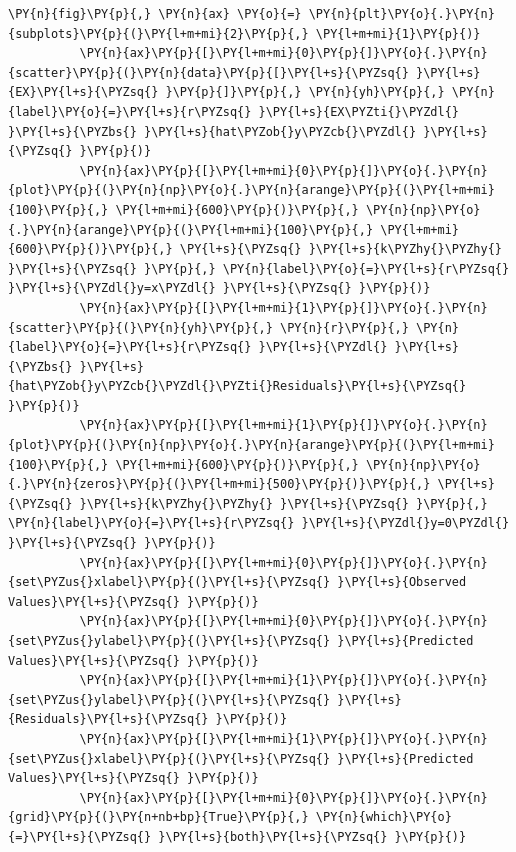 \documentclass[10pt]{article}\usepackage[]{graphicx}\usepackage[]{xcolor}
\begin{document}
    \begin{Verbatim}[commandchars=\\\{\}]
 \PY{n}{fig}\PY{p}{,} \PY{n}{ax} \PY{o}{=} \PY{n}{plt}\PY{o}{.}\PY{n}{subplots}\PY{p}{(}\PY{l+m+mi}{2}\PY{p}{,} \PY{l+m+mi}{1}\PY{p}{)}
          \PY{n}{ax}\PY{p}{[}\PY{l+m+mi}{0}\PY{p}{]}\PY{o}{.}\PY{n}{scatter}\PY{p}{(}\PY{n}{data}\PY{p}{[}\PY{l+s}{\PYZsq{} }\PY{l+s}{EX}\PY{l+s}{\PYZsq{} }\PY{p}{]}\PY{p}{,} \PY{n}{yh}\PY{p}{,} \PY{n}{label}\PY{o}{=}\PY{l+s}{r\PYZsq{} }\PY{l+s}{EX\PYZti{}\PYZdl{} }\PY{l+s}{\PYZbs{} }\PY{l+s}{hat\PYZob{}y\PYZcb{}\PYZdl{} }\PY{l+s}{\PYZsq{} }\PY{p}{)}
          \PY{n}{ax}\PY{p}{[}\PY{l+m+mi}{0}\PY{p}{]}\PY{o}{.}\PY{n}{plot}\PY{p}{(}\PY{n}{np}\PY{o}{.}\PY{n}{arange}\PY{p}{(}\PY{l+m+mi}{100}\PY{p}{,} \PY{l+m+mi}{600}\PY{p}{)}\PY{p}{,} \PY{n}{np}\PY{o}{.}\PY{n}{arange}\PY{p}{(}\PY{l+m+mi}{100}\PY{p}{,} \PY{l+m+mi}{600}\PY{p}{)}\PY{p}{,} \PY{l+s}{\PYZsq{} }\PY{l+s}{k\PYZhy{}\PYZhy{} }\PY{l+s}{\PYZsq{} }\PY{p}{,} \PY{n}{label}\PY{o}{=}\PY{l+s}{r\PYZsq{} }\PY{l+s}{\PYZdl{}y=x\PYZdl{} }\PY{l+s}{\PYZsq{} }\PY{p}{)}
          \PY{n}{ax}\PY{p}{[}\PY{l+m+mi}{1}\PY{p}{]}\PY{o}{.}\PY{n}{scatter}\PY{p}{(}\PY{n}{yh}\PY{p}{,} \PY{n}{r}\PY{p}{,} \PY{n}{label}\PY{o}{=}\PY{l+s}{r\PYZsq{} }\PY{l+s}{\PYZdl{} }\PY{l+s}{\PYZbs{} }\PY{l+s}{hat\PYZob{}y\PYZcb{}\PYZdl{}\PYZti{}Residuals}\PY{l+s}{\PYZsq{} }\PY{p}{)}
          \PY{n}{ax}\PY{p}{[}\PY{l+m+mi}{1}\PY{p}{]}\PY{o}{.}\PY{n}{plot}\PY{p}{(}\PY{n}{np}\PY{o}{.}\PY{n}{arange}\PY{p}{(}\PY{l+m+mi}{100}\PY{p}{,} \PY{l+m+mi}{600}\PY{p}{)}\PY{p}{,} \PY{n}{np}\PY{o}{.}\PY{n}{zeros}\PY{p}{(}\PY{l+m+mi}{500}\PY{p}{)}\PY{p}{,} \PY{l+s}{\PYZsq{} }\PY{l+s}{k\PYZhy{}\PYZhy{} }\PY{l+s}{\PYZsq{} }\PY{p}{,} \PY{n}{label}\PY{o}{=}\PY{l+s}{r\PYZsq{} }\PY{l+s}{\PYZdl{}y=0\PYZdl{} }\PY{l+s}{\PYZsq{} }\PY{p}{)}
          \PY{n}{ax}\PY{p}{[}\PY{l+m+mi}{0}\PY{p}{]}\PY{o}{.}\PY{n}{set\PYZus{}xlabel}\PY{p}{(}\PY{l+s}{\PYZsq{} }\PY{l+s}{Observed Values}\PY{l+s}{\PYZsq{} }\PY{p}{)}
          \PY{n}{ax}\PY{p}{[}\PY{l+m+mi}{0}\PY{p}{]}\PY{o}{.}\PY{n}{set\PYZus{}ylabel}\PY{p}{(}\PY{l+s}{\PYZsq{} }\PY{l+s}{Predicted Values}\PY{l+s}{\PYZsq{} }\PY{p}{)}
          \PY{n}{ax}\PY{p}{[}\PY{l+m+mi}{1}\PY{p}{]}\PY{o}{.}\PY{n}{set\PYZus{}ylabel}\PY{p}{(}\PY{l+s}{\PYZsq{} }\PY{l+s}{Residuals}\PY{l+s}{\PYZsq{} }\PY{p}{)}
          \PY{n}{ax}\PY{p}{[}\PY{l+m+mi}{1}\PY{p}{]}\PY{o}{.}\PY{n}{set\PYZus{}xlabel}\PY{p}{(}\PY{l+s}{\PYZsq{} }\PY{l+s}{Predicted Values}\PY{l+s}{\PYZsq{} }\PY{p}{)}
          \PY{n}{ax}\PY{p}{[}\PY{l+m+mi}{0}\PY{p}{]}\PY{o}{.}\PY{n}{grid}\PY{p}{(}\PY{n+nb+bp}{True}\PY{p}{,} \PY{n}{which}\PY{o}{=}\PY{l+s}{\PYZsq{} }\PY{l+s}{both}\PY{l+s}{\PYZsq{} }\PY{p}{)}

\end{Verbatim}
\end{document}
